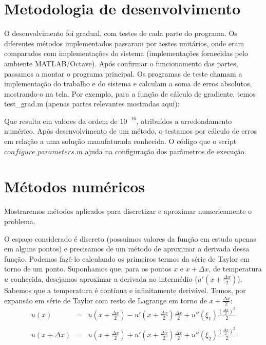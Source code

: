\documentclass[12pt,fleqn]{article}
\begin{document}
\section{Metodologia de desenvolvimento}
O desenvolvimento foi gradual, com testes de cada parte do programa. Os diferentes métodos implementados passaram por testes unitários, onde eram comparados com implementações do sistema (implementações fornecidas pelo ambiente MATLAB/Octave). Após confirmar o funcionamento das partes, passamos a montar o programa principal. Os programas de teste chamam a implementação do trabalho e do sistema e calculam a soma de erros absolutos, mostrando-o na tela. Por exemplo, para a função de cálculo de gradiente, temos test\_grad.m (apenas partes relevantes mostradas aqui):



Que resulta em valores da ordem de $10^{-16}$, atribuídos a arredondamento numérico. Após desenvolvimento de um método, o testamos por cálculo de erros em relação a uma solução manufaturada conhecida. O código que o script $configure\_parameters.m$ ajuda na configuração dos parâmetros de execução.

\section{Métodos numéricos}
Mostraremos métodos aplicados para discretizar e aproximar numericamente o problema.

O espaço considerado é discreto (possuimos valores da função em estudo apenas em alguns pontos) e precisamos de um método de aproximar a derivada dessa função. Podemos fazê-lo calculando os primeiros termos da série de Taylor em torno de um ponto. Suponhamos que, para os pontos $x$ e $x + \Delta x$, de temperatura $u$ conhecida, desejamos aproximar a derivada no intermédio ($u'(x + \frac{\Delta x}{2})$). Sabemos que a temperatura é contínua e infinitamente derivável. Temos, por expansão em série de Taylor com resto de Lagrange em torno de $x + \frac{\Delta x}{2}$:
\begin{equation}
\label{expansao_taylor_derivada}
\begin{array}{rcl}
	u(x) & = & u(x + \frac{\Delta x}{2}) - u'(x + \frac{\Delta x}{2}) \frac{\Delta x}{2} + u''(\xi_1) \frac{(\frac{\Delta x}{2}) ^ 2}{2} \\ \\
	u(x + \Delta x) & = & u(x + \frac{\Delta x}{2}) + u'(x + \frac{\Delta x}{2}) \frac{\Delta x}{2} + u''(\xi_2) \frac{(\frac{\Delta x}{2}) ^ 2}{2}
\end{array}
\end{equation}
\end{document}
